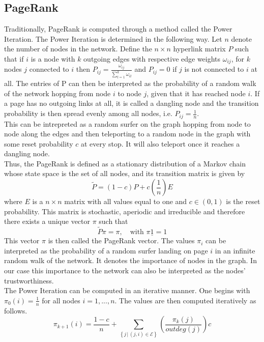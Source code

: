 \documentclass[twocolumn]{article}
\theoremstyle{definition}
\theoremstyle{theorem}
\begin{document}
\subsection{PageRank}
\label{subsec:PageRank}
Traditionally, PageRank is computed through a method called the Power Iteration. The Power Iteration is determined in the following way. Let $n$ denote the number of nodes in the network. Define the $n\times{}n$ hyperlink matrix $P$ such that if $i$ is a node with $k$ outgoing edges with respective edge weights $\omega_{ij}$, for $k$ nodes $j$ connected to $i$ then $P_{ij}=\frac{\omega_{ij}}{\sum_{l=1}^{k}\omega_{il}}$ and $P_{ij}=0$ if $j$ is not connected to $i$ at all. The entries of P can then be interpreted as the probability of a random walk of the network hopping from node $i$ to node $j$, given that it has reached node $i$. If a page has no outgoing links at all, it is called a dangling node and the transition probability is then spread evenly among all nodes, i.e. $P_{ij}=\frac{1}{n}$.\vspace{1em}\\

\noindent This can be intrepreted as a random surfer on the graph hopping from node to node along the edges and then teleporting to a random node in the graph with some reset probability $c$ at every stop. It will also teleport once it reaches a dangling node.\vspace{1em}\\

\noindent Thus, the PageRank is defined as a stationary distribution of a Markov chain whose state space is the set of all nodes, and its transition matrix is given by 
\[ 
\tilde{P} = (1-c)P + c\left(\frac{1}{n}\right)E 
\]
where $E$ is a $n\times{}n$ matrix with all values equal to one and $c\in{}(0,1)$ is the reset probability. This matrix is stochastic, aperiodic and irreducible and therefore there exists a unique vector $\pi$ such that 
\[
\tilde{P}\pi = \pi,\quad \textrm{with } \pi\underline{1} = 1 
\]
This vector $\pi$ is then called the PageRank vector. The values $\pi_i$ can be interpreted as the probability of a random surfer landing on page $i$ in an infinite random walk of the network. It denotes the importance of nodes in the graph. In our case this importance to the network can also be interpreted as the nodes' trustworthiness. \vspace{1em}\\

\noindent The Power Iteration can be computed in an iterative manner. One begins with $\pi_0(i)=\frac{1}{n}$ for all nodes $i=1,...,n$. The values are then computed iteratively as follows. 
\[
\pi_{k+1}(i) = \frac{1-c}{n} + \sum_{\left\lbrace j\,|\,(j,i)\in\mathcal{E}\right\rbrace}\left(\frac{\pi_k(j)}{outdeg(j)}\right)c 
\]
\end{document}
